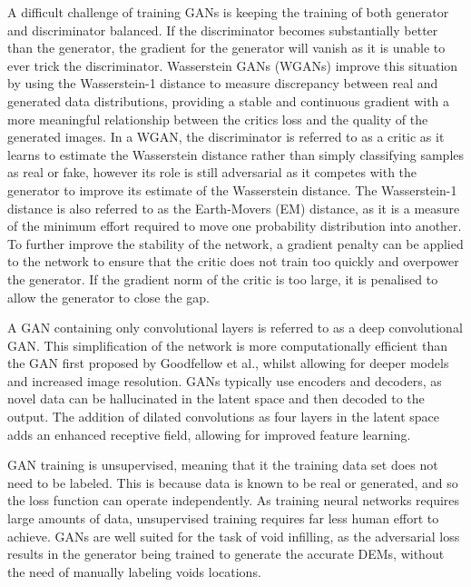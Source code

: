 \documentclass[twocolumn]{article}
\begin{document}
A difficult challenge of training GANs is keeping the training of both generator and discriminator balanced.
If the discriminator becomes substantially better than the generator, the gradient for the generator will vanish as it is unable to ever trick the discriminator.
Wasserstein GANs\autocite{arjovskyWassersteinGenerativeAdversarial2017} (WGANs) improve this situation by using the Wasserstein-1 distance to measure discrepancy between real and generated data distributions, providing a stable and continuous gradient with a more meaningful relationship between the critics loss and the quality of the generated images.
In a WGAN, the discriminator is referred to as a critic as it learns to estimate the Wasserstein distance rather than simply classifying samples as real or fake, however its role is still adversarial as it competes with the generator to improve its estimate of the Wasserstein distance.
The Wasserstein-1 distance is also referred to as the Earth-Movers (EM) distance, as it is a measure of the minimum effort required to move one probability distribution into another.
To further improve the stability of the network, a gradient penalty can be applied to the network to ensure that the critic does not train too quickly and overpower the generator\autocite{gulrajaniImprovedTrainingWasserstein2017}.
If the gradient norm of the critic is too large, it is penalised to allow the generator to close the gap.

A GAN containing only convolutional layers is referred to as a deep convolutional GAN\autocite{radfordUnsupervisedRepresentationLearning2016}.
This simplification of the network is more computationally efficient than the GAN first proposed by Goodfellow et al.\autocite{goodfellowGenerativeAdversarialNetworks2020}, whilst allowing for deeper models and increased image resolution.
GANs typically use encoders and decoders, as novel data can be hallucinated in the latent space and then decoded to the output.
The addition of dilated convolutions\autocite{yuMultiScaleContextAggregation2016} as four layers in the latent space adds an enhanced receptive field, allowing for improved feature learning.

GAN training is unsupervised, meaning that it the training data set does not need to be labeled.
This is because data is known to be real or generated, and so the loss function can operate independently.
As training neural networks requires large amounts of data, unsupervised training requires far less human effort to achieve.
GANs are well suited for the task of void infilling, as the adversarial loss results in the generator being trained to generate the accurate DEMs, without the need of manually labeling voids locations.
\end{document}
